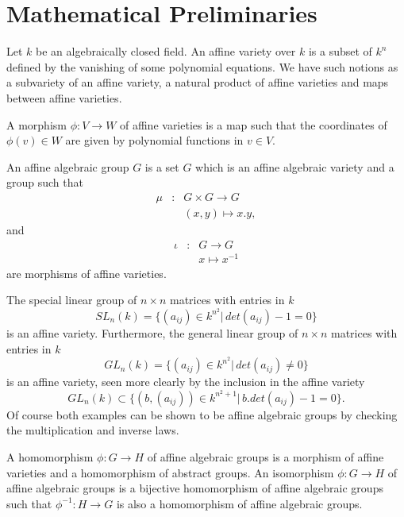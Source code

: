 
\chapter{Mathematical Preliminaries}
\label{Chapter2}

Let $k$ be an algebraically closed field. An affine variety over $k$ is a subset of $k^n$ defined by the vanishing of some polynomial equations. We have such notions as a subvariety of an affine variety, a natural product of affine varieties and maps between affine varieties.

A morphism $\phi:V \rightarrow W$ of affine varieties is a map such that the coordinates of $\phi(v) \in W$ are given by polynomial functions in $v \in V$.

An affine algebraic group $G$ is a set $G$ which is an affine algebraic variety and a group such that
\begin{eqnarray*}
	\mu&:& G \times G \rightarrow G\\
	&&(x,y) \mapsto x.y,
\end{eqnarray*}
and
\begin{eqnarray*}
	\iota&:& G \rightarrow G \\
	&&x \mapsto x^{-1}
\end{eqnarray*}
are morphisms of affine varieties.

\begin{example}
	The special linear group of $n\times n$ matrices with entries in $k$
	\begin{displaymath}
		SL_n(k) = \{(a_{ij}) \in k^{n^2} |\, det(a_{ij}) - 1 = 0\}
	\end{displaymath}
	is an affine variety. Furthermore, the general linear group of $n\times n$ matrices with entries in $k$
	\begin{displaymath}
		GL_n(k) = \{(a_{ij}) \in k^{n^2} |\, det(a_{ij}) \neq 0\}
	\end{displaymath}
	is an affine variety, seen more clearly by the inclusion in the affine variety
	\begin{displaymath}
		GL_n(k)\subset \{(b, (a_{ij})) \in k^{n^2 + 1} |\, b.det(a_{ij}) - 1 = 0\}.
	\end{displaymath}
	Of course both examples can be shown to be affine algebraic groups by checking the multiplication and inverse laws.
\end{example}

A homomorphism $\phi: G\rightarrow H$ of affine algebraic groups is a morphism of affine varieties and a homomorphism of abstract groups. An isomorphism $\phi: G\rightarrow H$ of affine algebraic groups is a bijective homomorphism of affine algebraic groups such that $\phi^{-1}:H\rightarrow G$ is also a homomorphism of affine algebraic groups.

